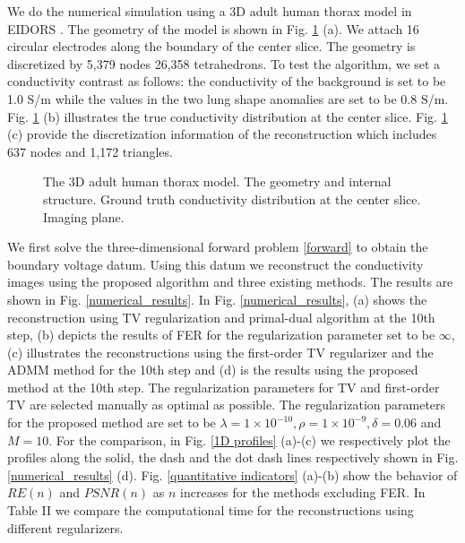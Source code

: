 \documentclass[lettersize,journal]{IEEEtran}
\begin{document}
We do the numerical simulation using a 3D adult human thorax model in EIDORS \cite{Adler2006}. The geometry of the model is shown in Fig. \ref{Numerical_model} (a).
We attach 16 circular electrodes along the boundary of the center slice. The geometry is discretized by 5,379 nodes 26,358 tetrahedrons. To test the algorithm, we set a conductivity contrast as follows: the conductivity of the background is set to be 1.0 S/m while the values in the two lung shape anomalies are set to be 0.8 S/m. Fig. \ref{Numerical_model} (b) illustrates the true conductivity distribution at the center slice. Fig. \ref{Numerical_model} (c) provide the discretization information of the reconstruction which includes 637 nodes and 1,172  triangles.
\begin{figure}[htbp]
 \centering
 \hfill
 \hfill

 \caption{The 3D adult human thorax model. \protect{} The geometry and internal structure. \protect{} Ground truth conductivity distribution at the center slice. \protect{} Imaging plane.}
\label{Numerical_model}
\end{figure}


We first solve the three-dimensional forward problem \eqref{forward} to obtain the boundary voltage datum. Using this datum we reconstruct the conductivity images using the proposed algorithm and three existing methods. The results are shown in Fig. \ref{numerical_results}. In Fig. \ref{numerical_results}, (a) shows the reconstruction using TV regularization and primal-dual algorithm at the 10th step, (b) depicts the results of FER for the regularization parameter set to be $\infty$, (c) illustrates the reconstructions using the first-order TV regularizer and the ADMM method for the 10th step and (d) is the results using the proposed method at the 10th step.
The regularization parameters for TV and first-order TV are selected manually as optimal as possible. %
The regularization parameters for the proposed method are set to be $\lambda=1 \times 10^{-10}, \rho=1 \times 10^{-9}, \delta = 0.06$ and $M=10$. For the comparison, in Fig. \ref{1D profiles} (a)-(c) we respectively plot the profiles along the solid, the dash and the dot dash lines respectively shown in Fig. \ref{numerical_results} (d). Fig. \ref{quantitative indicators} (a)-(b) show the behavior of $RE(n)$ and $PSNR(n)$ as $n$ increases for the methods excluding FER. In Table II we compare the computational time for the reconstructions using different regularizers.
\end{document}
